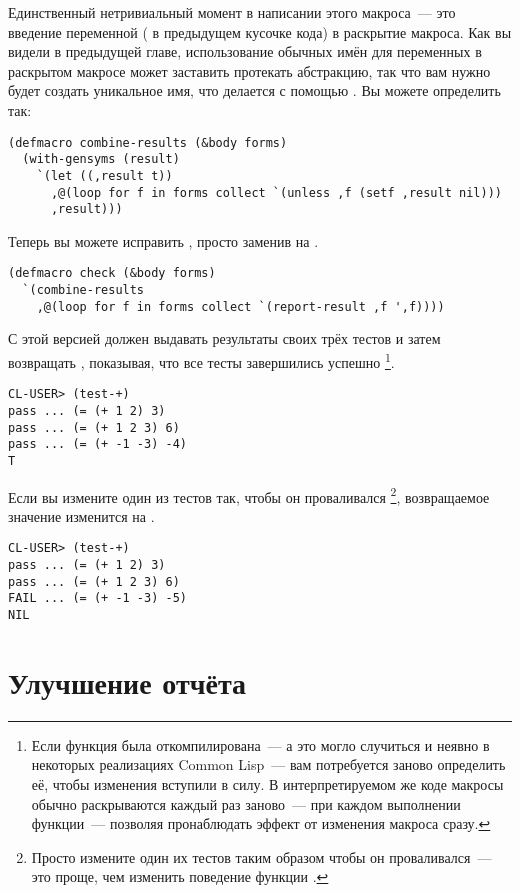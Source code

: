 Единственный нетривиальный момент в написании этого макроса~--- это введение переменной
( в предыдущем кусочке кода) в раскрытие макроса. Как вы видели в предыдущей
главе, использование обычных имён для переменных в раскрытом макросе может заставить
протекать абстракцию, так что вам нужно будет создать уникальное имя, что делается с
помощью . Вы можете определить  так:

\begin{lstlisting}
(defmacro combine-results (&body forms)
  (with-gensyms (result)
    `(let ((,result t))
      ,@(loop for f in forms collect `(unless ,f (setf ,result nil)))
      ,result)))
\end{lstlisting}

Теперь вы можете исправить , просто заменив  на
.

\begin{lstlisting}
(defmacro check (&body forms)
  `(combine-results
    ,@(loop for f in forms collect `(report-result ,f ',f))))
\end{lstlisting}

С этой версией   должен выдавать результаты своих трёх тестов и
затем возвращать , показывая, что все тесты завершились успешно \footnote{Если
  функция  была откомпилирована~--- а это могло случиться и неявно в
  некоторых реализациях Common Lisp~--- вам потребуется заново определить её, чтобы
  изменения вступили в силу. В интерпретируемом же коде макросы обычно раскрываются каждый
  раз заново~--- при каждом выполнении функции~--- позволяя пронаблюдать эффект от
  изменения макроса сразу.}.

\begin{lstlisting}
CL-USER> (test-+)
pass ... (= (+ 1 2) 3)
pass ... (= (+ 1 2 3) 6)
pass ... (= (+ -1 -3) -4)
T
\end{lstlisting}

Если вы измените один из тестов так, чтобы он проваливался \footnote{Просто измените один
  их тестов таким образом чтобы он проваливался~--- это проще, чем изменить поведение
  функции \code{+}.}, возвращаемое значение изменится на .

\begin{lstlisting}
CL-USER> (test-+)
pass ... (= (+ 1 2) 3)
pass ... (= (+ 1 2 3) 6)
FAIL ... (= (+ -1 -3) -5)
NIL
\end{lstlisting}

\section{Улучшение отчёта}

